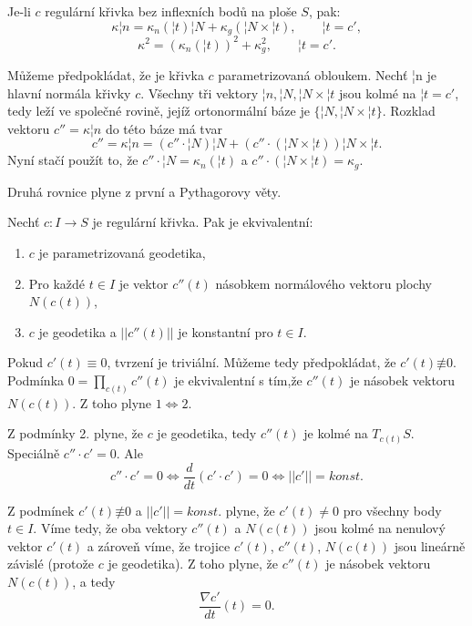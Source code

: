 \documentclass[12pt]{article}                   %
\begin{document}
        \begin{veta}
            Je-li $c$ regulární křivka bez inflexních bodů na ploše $S$, pak:
            $$ \kappa ¦n = \kappa_n(¦t)¦N + \kappa_g(¦N \times ¦t), \qquad ¦t = c', $$
            $$ \kappa^2 = (\kappa_n(¦t))^2 + \kappa_g^2, \qquad ¦t = c'. $$

            \begin{dukazin}
                Můžeme předpokládat, že je křivka $c$ parametrizovaná obloukem. Nechť ¦n je hlavní normála křivky $c$. Všechny tři vektory $¦n, ¦N , ¦N \times ¦t$ jsou kolmé na $¦t = c'$, tedy leží ve společné rovině, jejíž ortonormální báze je $\{¦N, ¦N \times ¦t\}$. Rozklad vektoru $c'' = \kappa¦n$ do této báze má tvar
                $$ c'' = \kappa¦n = (c''·¦N)¦N + (c''·(¦N \times ¦t))¦N \times ¦t. $$
                Nyní stačí použít to, že $c''·¦N = \kappa_n(¦t)$ a $c''·(¦N \times ¦t) = \kappa_g$.

                Druhá rovnice plyne z první a Pythagorovy věty.
            \end{dukazin}
        \end{veta}

        \begin{lemma}
            Nechť $c: I \rightarrow S$ je regulární křivka. Pak je ekvivalentní:
            
            \begin{enumerate}
                \item $c$ je parametrizovaná geodetika,
                \item Pro každé $t \in I$ je vektor $c''(t)$ násobkem normálového vektoru plochy $N(c(t))$,
                \item $c$ je geodetika a $||c''(t)||$ je konstantní pro $t \in I$.
            \end{enumerate}

            \begin{dukazin}
                Pokud $c'(t) ≡ 0$, tvrzení je triviální. Můžeme tedy předpokládat, že $c'(t) \not≡ 0$. Podmínka $0 = \prod_{c(t)}c''(t)$ je ekvivalentní s tím,že $c''(t)$ je násobek vektoru $N(c(t))$. Z toho plyne $1 \Leftrightarrow 2$.

                Z podmínky 2. plyne, že $c$ je geodetika, tedy $c''(t)$ je kolmé na $T_{c(t)}S$. Speciálně $c''·c' = 0$. Ale
                $$ c''·c' = 0 \Leftrightarrow \frac{d}{dt}(c'·c') = 0 \Leftrightarrow ||c'|| = konst. $$

                Z podmínek $c'(t) \not≡0$ a $||c'|| = konst.$ plyne, že $c'(t) ≠ 0$ pro všechny body $t \in I$. Víme tedy, že oba vektory $c''(t)$ a $N(c(t))$ jsou kolmé na nenulový vektor $c'(t)$ a zároveň víme, že trojice $c'(t)$, $c''(t)$, $N(c(t))$ jsou lineárně závislé (protože $c$ je geodetika). Z toho plyne, že $c''(t)$ je násobek vektoru $N(c(t))$, a tedy
                $$ \frac{\nabla c'}{dt}(t) = 0. $$
            \end{dukazin}
        \end{lemma}
\end{document}
